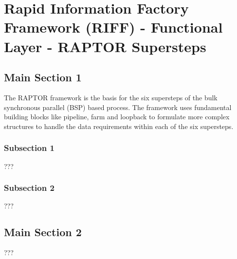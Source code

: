 
\chapter{Rapid Information Factory Framework (RIFF) - Functional Layer - RAPTOR Supersteps} %

\label{Chapter10} %



\section{Main Section 1}

The RAPTOR framework is the basis for the six supersteps of the bulk synchronous parallel (BSP) based process. The framework uses fundamental building blocks like pipeline, farm and loopback to formulate more complex structures to handle the data requirements within each of the six supersteps.

\subsection{Subsection 1}

???


\subsection{Subsection 2}

???


\section{Main Section 2}

???
